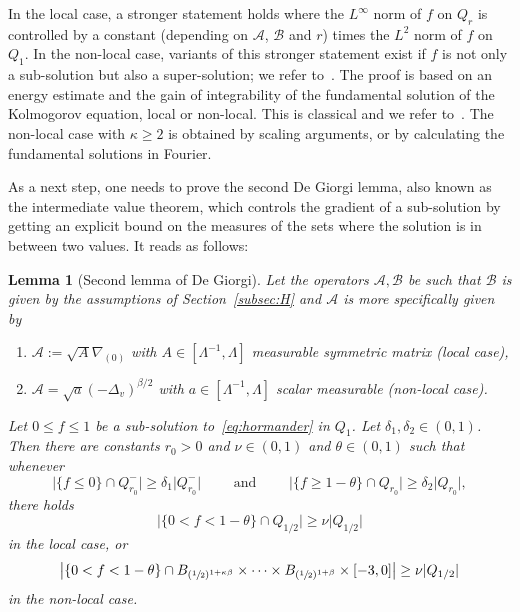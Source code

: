 \documentclass[JEP,XML,SOM,Unicode,NoFloatCountersInSection,published]{cedram}
\newenvironment{enumeratei}
{\bgroup\def\theenumi{\roman{enumi}}\def\theenumii{\arabic{enumii}}\begin{enumerate}}
{\end{enumerate}\egroup}
\newtheorem{lemma}[theorem]{Lemma}
\theoremstyle{definition}
\newcommand{\cA}{{\mathcal A}}
\newcommand{\cB}{{\mathcal B}}
\begin{document}
In the local case, a stronger statement holds where the
$L^\infty$ norm of $f$ on $Q_r$ is controlled by a constant
(depending on $\cA$, $\cB$ and $r$) times the $L^2$ norm of $f$
on $Q_1$. In the non-local case, variants of this stronger
statement exist if $f$ is not only a sub-solution but also a
super-solution; we refer to~\cite{Loher-2023, Loher-2024}. The proof is based
on an energy estimate and the gain of integrability of the
fundamental solution of the Kolmogorov equation, local or
non-local. This is classical and we refer
to~\cite{guerand-mouhot,loher-2022-preprint-quantitative-de-giorgi,AR-harnack, PP, IS-weak, APP}. The
non-local case with $\kappa \geq 2$ is obtained
by scaling arguments, or by calculating the fundamental
solutions in Fourier.

As a next step, one needs to prove the second De Giorgi lemma, also known as the intermediate value theorem, which controls the gradient of a sub-solution by getting an explicit bound on the measures of the sets where the solution is in between two values.
It reads as follows:
\begin{lemma}[Second lemma of De Giorgi]
Let the operators $\cA, \cB$ be such that $\cB$ is given by
the assumptions of Section~\ref{subsec:H} and $\cA$ is more specifically given by
\begin{enumeratei}
\item
$\cA:=\sqrt{A} \nabla_{(0)}$ with
$A \in [\Lambda^{-1},\Lambda]$ measurable symmetric matrix (local
case),
\item
$\cA = \sqrt{a} (-\Delta_v)^{\beta/2}$ with
$a \in [\Lambda^{-1},\Lambda]$ scalar measurable (non-local
case).
\end{enumeratei}
Let $0 \leq f \leq 1$ be a sub-solution to~\eqref{eq:hormander} in $Q_1$. Let $\delta_1, \delta_2 \in (0, 1)$. Then there are
constants $r_0 > 0$ and $\nu \in (0, 1)$ and
$\theta \in (0, 1)$ such that whenever
\begin{equation*}
\label{eq:conditions-ivl}
\vert \{f \leq 0\} \cap Q_{r_0}^-\vert \geq \delta_1 \vert
Q_{r_0}^-\vert \qquad \textrm{ and } \qquad \vert \{f \geq
1-\theta\} \cap Q_{r_0}\vert \geq \delta_2 \vert Q_{r_0}\vert,
\end{equation*}
there holds
\begin{equation*}
\big\vert \{0 < f < 1-\theta\} \cap Q_{1/2}\big\vert \geq \nu
\vert Q_{1/2}\vert
\end{equation*}
in the local case, or
\begin{equation*}
\big\vert \{0 < f < 1-\theta\} \cap
B_{(\sfrac12)^{1+\kappa\beta}} \times \cdots \times
B_{(\sfrac12)^{1+\beta}} \times [-3,0] \big\vert \geq \nu
\vert Q_{1/2}\vert
\end{equation*}
in the non-local case.
\end{lemma}
\end{document}
